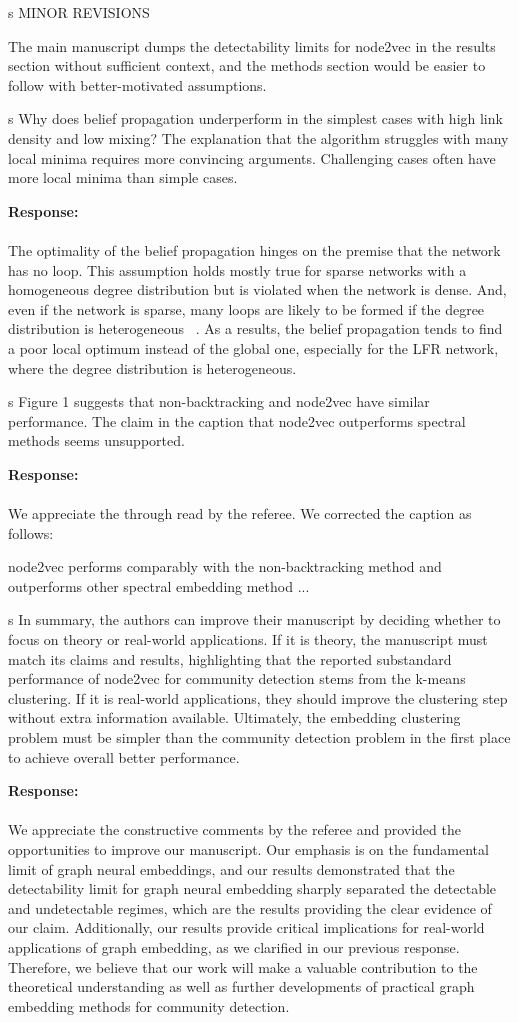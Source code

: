 \documentclass[12pt]{article}
\newcounter{comment}[subsection]
\newcommand{\response}[1]{{\noindent \textbf{Response:} \\ \\ \noindent #1}}
\newcommand{\rcomment}[1]{%
\vspace{10pt}
\begin{sectionbox}
s #1
\end{sectionbox}
}
\begin{document}
\rcomment{
MINOR REVISIONS 

The main manuscript dumps the detectability limits for node2vec in the results section without sufficient context, and the methods section would be easier to follow with better-motivated assumptions. 
}

\rcomment{
Why does belief propagation underperform in the simplest cases with high link density and low mixing? The explanation that the algorithm struggles with many local minima requires more convincing arguments. Challenging cases often have more local minima than simple cases. 
}

\response{
The optimality of the belief propagation hinges on the premise that the network has no loop. This assumption holds mostly true for sparse networks with a homogeneous degree distribution but is violated when the network is dense. 
And, even if the network is sparse, many loops are likely to be formed if  
 the degree distribution is heterogeneous ~\cite{Bianconi2005LoopsOA,Cantwell2023}.
As a results, the belief propagation tends to find a poor local optimum instead of the global one, especially for the LFR network, where the degree distribution is heterogeneous.
}

\rcomment{
Figure 1 suggests that non-backtracking and node2vec have similar performance. The claim in the caption that node2vec outperforms spectral methods seems unsupported. 
}

\response{
We appreciate the through read by the referee. We corrected the caption as follows:

\begin{displayquote}
\color{blue}
node2vec performs comparably with the non-backtracking method and outperforms other spectral embedding method ... 
\end{displayquote}
}


\rcomment{
In summary, the authors can improve their manuscript by deciding whether to focus on theory or real-world applications. If it is theory, the manuscript must match its claims and results, highlighting that the reported substandard performance of node2vec for community detection stems from the k-means clustering. If it is real-world applications, they should improve the clustering step without extra information available. Ultimately, the embedding clustering problem must be simpler than the community detection problem in the first place to achieve overall better performance.
}

\response{
We appreciate the constructive comments by the referee and provided the opportunities to improve our manuscript.  
Our emphasis is on the fundamental limit of graph neural embeddings, and our results demonstrated that the detectability limit for graph neural embedding sharply separated the detectable and undetectable regimes, which are the results providing the clear evidence of our claim. Additionally, our results provide critical implications for real-world applications of graph embedding, as we clarified in our previous response. 
Therefore, we believe that our work will make a valuable contribution to the theoretical understanding as well as further developments of practical graph embedding methods for community detection.  
}


\clearpage
\printbibliography{}
\end{document}
